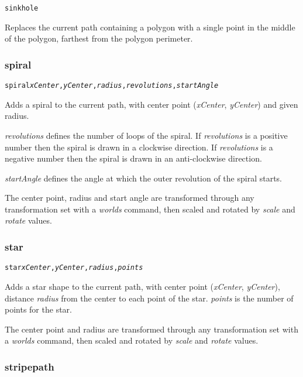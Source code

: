 \begin{alltt}
sinkhole
\end{alltt}

Replaces the current path containing a polygon with a single point in the
middle of the polygon, farthest from the polygon perimeter.

\subsubsection{spiral}

\begin{alltt}
spiral \textit{xCenter}, \textit{yCenter}, \textit{radius}, \textit{revolutions}, \textit{startAngle}
\end{alltt}

Adds a spiral to the current path, with center
point (\textit{xCenter}, \textit{yCenter}) and given radius.

\textit{revolutions} defines the number of loops of the spiral.
If \textit{revolutions}
is a positive number then the spiral is drawn in a clockwise direction.
If \textit{revolutions} is a negative number then the spiral
is drawn in an anti-clockwise direction.

\textit{startAngle} defines the
angle at which the outer revolution of the spiral starts.

The center point, radius and start angle are transformed through any
transformation set with a \textit{worlds} command,
then scaled and rotated by \textit{scale}
and \textit{rotate} values.

\subsubsection{star}

\begin{alltt}
star \textit{xCenter}, \textit{yCenter}, \textit{radius}, \textit{points}
\end{alltt}

Adds a star shape to the current path, with center
point (\textit{xCenter}, \textit{yCenter}), distance
\textit{radius}
from the center to each point of the star.
\textit{points} is the number of points for the star.

The center point and radius are transformed through any
transformation set with a \textit{worlds} command,
then scaled and rotated by \textit{scale}
and \textit{rotate} values.

\subsubsection{stripepath}

